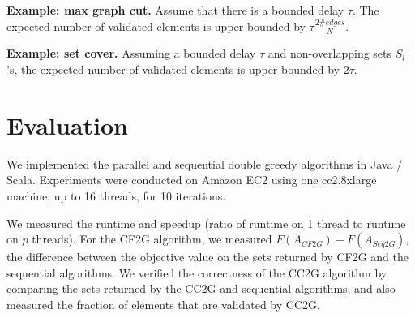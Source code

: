 \documentclass{article} %
\newcommand{\hogwild}{CF2G}
\newcommand{\occ}{CC2G}
\newcommand{\seqalg}{Seq2G}
\begin{document}
\textbf{Example: max graph cut.}
Assume that there is a bounded delay $\tau$.
The expected number of validated elements is upper bounded by $\tau \frac{2\#edges}{N}$.

\textbf{Example: set cover.}
Assuming a bounded delay $\tau$ and non-overlapping sets $S_l$'s, the expected number of validated elements is upper bounded by $2\tau$.

















\section{Evaluation}

We implemented the parallel and sequential double greedy algorithms in Java / Scala.
Experiments were conducted on Amazon EC2 using one cc2.8xlarge machine, up to 16 threads, for 10 iterations.

We measured the runtime and speedup (ratio of runtime on 1 thread to runtime on $p$ threads).
For the \hogwild{} algorithm, we measured $F(A_{\hogwild})-F(A_{\seqalg})$, the difference between the objective value on the sets returned by \hogwild{} and the sequential algorithms.
We verified the correctness of the \occ{} algorithm by comparing the sets returned by the \occ{} and sequential algorithms, and also measured the fraction of elements that are validated by \occ{}.

\end{document}
